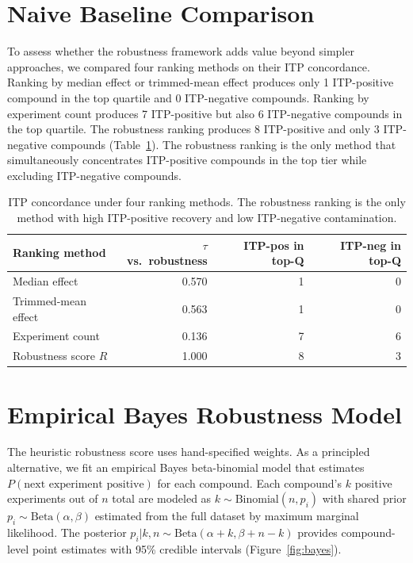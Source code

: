 \documentclass[11pt]{article}
\begin{document}
\section{Naive Baseline Comparison}
\label{sec:baselines}
To assess whether the robustness framework adds value beyond simpler approaches, we compared four ranking methods on their ITP concordance. Ranking by median effect or trimmed-mean effect produces only 1 ITP-positive compound in the top quartile and 0 ITP-negative compounds. Ranking by experiment count produces 7 ITP-positive but also 6 ITP-negative compounds in the top quartile. The robustness ranking produces 8 ITP-positive and only 3 ITP-negative compounds (Table~\ref{tab:baselines}). The robustness ranking is the only method that simultaneously concentrates ITP-positive compounds in the top tier while excluding ITP-negative compounds.

\begin{table}[H]
\centering
\small
\begin{tabular}{lrrr}
\toprule
Ranking method & $\tau$ vs.\ robustness & ITP-pos in top-Q & ITP-neg in top-Q \\
\midrule
Median effect & 0.570 & 1 & 0 \\
Trimmed-mean effect & 0.563 & 1 & 0 \\
Experiment count & 0.136 & 7 & 6 \\
Robustness score $R$ & 1.000 & 8 & 3 \\
\bottomrule
\end{tabular}
\caption{ITP concordance under four ranking methods. The robustness ranking is the only method with high ITP-positive recovery and low ITP-negative contamination.}
\label{tab:baselines}
\end{table}

\section{Empirical Bayes Robustness Model}
\label{sec:bayes}
The heuristic robustness score uses hand-specified weights. As a principled alternative, we fit an empirical Bayes beta-binomial model that estimates $P(\text{next experiment positive})$ for each compound. Each compound's $k$ positive experiments out of $n$ total are modeled as $k \sim \text{Binomial}(n, p_i)$ with shared prior $p_i \sim \text{Beta}(\alpha, \beta)$ estimated from the full dataset by maximum marginal likelihood. The posterior $p_i | k, n \sim \text{Beta}(\alpha + k, \beta + n - k)$ provides compound-level point estimates with 95\% credible intervals (Figure~\ref{fig:bayes}).
\end{document}
